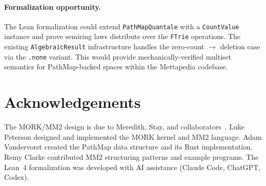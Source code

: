 \documentclass[11pt]{article}
\theoremstyle{definition}
\theoremstyle{remark}
\newcommand{\MORK}{\textup{MORK}}
\newcommand{\PathMap}{\textup{PathMap}}
\begin{document}
\paragraph{Formalization opportunity.}
The Lean formalization could extend \texttt{PathMapQuantale} with a
\texttt{CountValue} instance and prove semiring laws distribute over
the \texttt{FTrie} operations.  The existing \texttt{AlgebraicResult}
infrastructure handles the zero-count $\to$ deletion case via the
\texttt{.none} variant.  This would provide mechanically-verified
multiset semantics for \PathMap{}-backed spaces within the Mettapedia
codebase.

\section*{Acknowledgements}

The \MORK{}/MM2 design is due to Meredith, Stay, and
collaborators~\cite{MeredithStayOSLF2020}.
Luke Peterson designed and implemented the \MORK{} kernel and MM2 language.
Adam Vandervorst created the \PathMap{} data structure and its Rust
implementation.
Remy Clarke contributed MM2 structuring patterns and example programs.
The Lean~4 formalization was developed with AI assistance (Claude Code,
ChatGPT, Codex).
\end{document}
